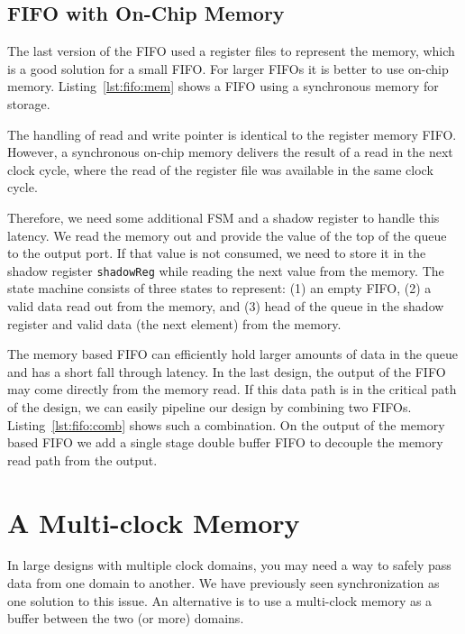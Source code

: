 \documentclass[%
    10pt,
    headinclude, footexclude,
    openright, %
    notitlepage,
    cleardoubleempty,
    headsepline,
    pointlessnumbers,
    bibtotoc, idxtotoc,
    ]{scrbook}
\newcommand{\code}[1]{{\small{\texttt{#1}}}}
\begin{document}
\subsection{FIFO with On-Chip Memory}

The last version of the FIFO used a register files to represent the memory,
which is a good solution for a small FIFO. For larger FIFOs it is better to
use on-chip memory.
Listing~\ref{lst:fifo:mem} shows a FIFO using a synchronous memory for
storage.


The handling of read and write pointer is identical to the register memory
FIFO. However, a synchronous on-chip memory delivers the result of a read
in the next clock cycle, where the read of the register file was available in the
same clock cycle.

Therefore, we need some additional FSM and a shadow register to handle
this latency. We read the memory out and provide the value of the top of the queue
to the output port. If that value is not consumed, we need to store it in the
shadow register \code{shadowReg} while reading the next value from the memory.
The state machine consists of three states to represent: (1) an empty FIFO, (2) a valid
data read out from the memory, and (3) head of the queue in the shadow register and
valid data (the next element) from the memory.

The memory based FIFO can efficiently hold larger amounts of data in the queue
and has a short fall through latency. In the last design, the output of the FIFO may
come directly from the memory read. If this data path is in the critical path of the design,
we can easily pipeline our design by combining two FIFOs. Listing~\ref{lst:fifo:comb}
shows such a combination. On the output of the memory based FIFO we add a single
stage double buffer FIFO to decouple the memory read path from the output.


\section{A Multi-clock Memory}

In large designs with multiple clock domains, you may need a way to safely 
pass data from one domain to another. We have previously seen synchronization as 
one solution to this issue. An alternative is to use a multi-clock memory as 
a buffer between the two (or more) domains. 
\end{document}
